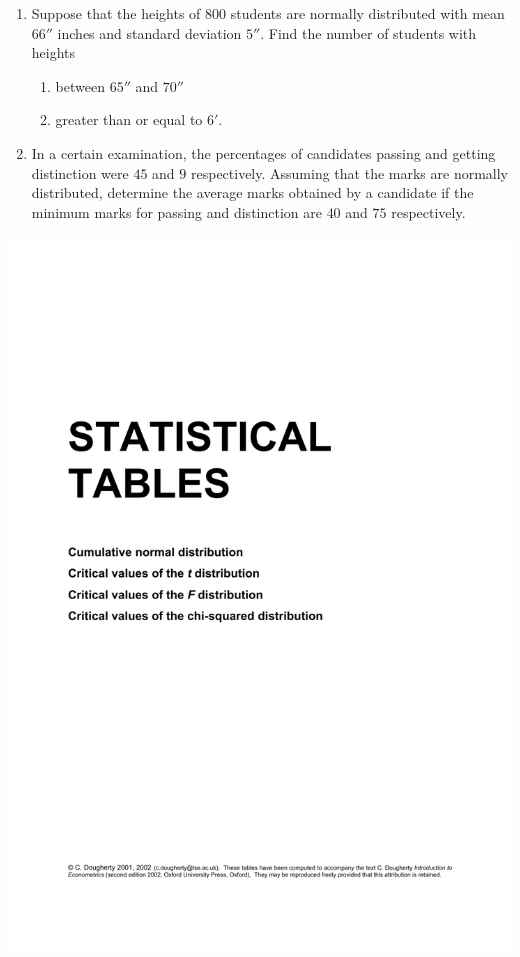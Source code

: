 \documentclass[svgnames]{amsart}
\begin{document}
\begin{enumerate}[leftmargin=*]
\item Suppose that the heights of $800$ students are normally distributed with mean $66''$ inches and standard deviation $5''$. Find the number of students with heights
\begin{enumerate}
	\item between $65''$ and $70''$
	\item greater than or equal to $6'$.
\end{enumerate}

\item In a certain examination, the percentages of candidates passing and getting distinction were $45$ and $9$ respectively. Assuming that the marks are normally distributed, determine the average marks obtained by a candidate if the minimum marks for passing and distinction are $40$ and $75$ respectively.
\end{enumerate}

\includegraphics[trim = 65 30 50 95, clip, page=2, width=\linewidth]{Statistical Tables.pdf}
\end{document}
